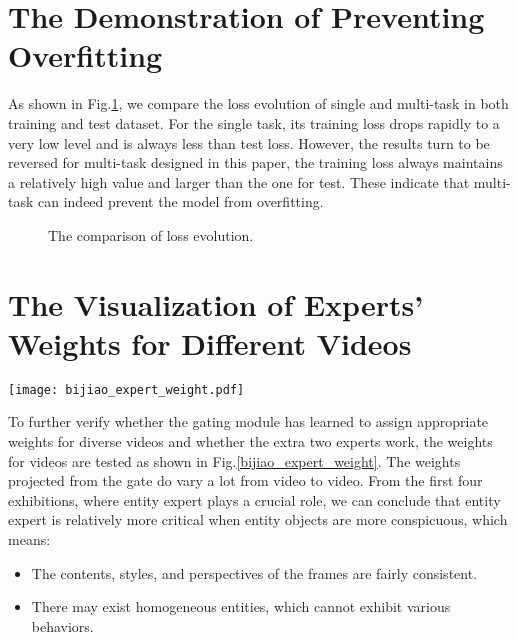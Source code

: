 \documentclass[letterpaper]{article} \usepackage{aaai22}  \usepackage{times}  \usepackage{helvet}  \usepackage{courier}  \usepackage[hyphens]{url}  \usepackage{graphicx} \urlstyle{rm} \def\UrlFont{\rm}  \usepackage{natbib}  \usepackage{caption}
\begin{document}


\appendix
\section{The Demonstration of Preventing Overfitting}
As shown in Fig.\ref{loss_evolution}, we compare the loss evolution of single and multi-task in both training and test dataset. For the single task, its training loss drops rapidly to a very low level and is always less than test loss. However, the results turn to be reversed for multi-task designed in this paper, the training loss always maintains a relatively high value and larger than the one for test.
These indicate that multi-task can indeed prevent the model from overfitting.

\begin{figure}[t]
\begin{center}

\end{center}
\caption{The comparison of loss evolution.}
\label{loss_evolution}
\end{figure}


\section{The Visualization of Experts' Weights for Different Videos}

\begin{figure*}[bh]
\begin{center}
\texttt{[image: bijiao\_expert\_weight.pdf]}\caption{The visualization of experts' weights for different videos}
\label{bijiao_expert_weight}
\end{center}
\end{figure*}
To further verify whether the gating module has learned to assign appropriate weights for diverse videos and whether the extra two experts work, the weights for videos are tested as shown in Fig.\ref{bijiao_expert_weight}. The weights projected from the gate do vary a lot from video to video. From the first four exhibitions, where entity expert plays a crucial role, we can conclude that entity expert is relatively more critical when entity objects are more conspicuous, which means:
 \begin{itemize}
     \item The contents, styles, and perspectives of the frames are fairly consistent.
     \item There may exist homogeneous entities, which cannot exhibit various behaviors.
 \end{itemize}
\end{document}

